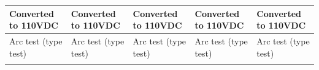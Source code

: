 \documentclass[11pt,a4paper]{article}
\begin{document}
\begin{table}[h]
\begin{tabular}{|l|l|l|l|l|}
\hline
Converted to 110VDC  & Converted to 110VDC  & Converted to 110VDC  & Converted to 110VDC  & Converted to 110VDC  \\ \hline
Arc test (type test) & Arc test (type test) & Arc test (type test) & Arc test (type test) & Arc test (type test) \\ \hline
 &  &  &  &  \\ \hline
\end{tabular}
\end{table}
\end{document}
